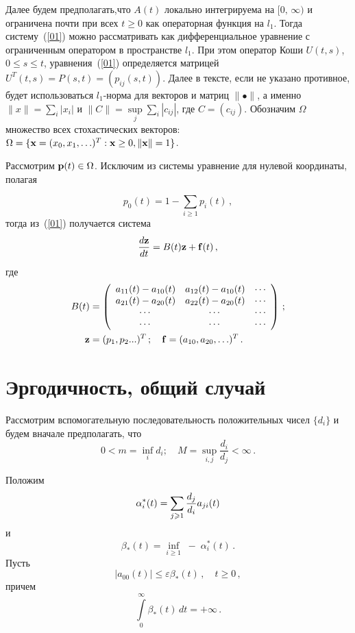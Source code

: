 \begin{multicols}{2}
Далее будем предполагать,что $A(t)$ локально интегрируема на
$[0,\,\infty)$ и ограничена почти при всех $t \ge 0 $ как
операторная функция  на $l_{1}$. Тогда систему~(\ref{01}) можно
рассматривать как дифференциальное уравнение с
ог\-ра\-ни\-чен\-ным оператором в пространстве $l_{1}$. При этом
оператор Коши $ U(t,s)$, $0{\leq s\leq t}$, уравнения~(\ref{01})
определяется матрицей $
U^{T}(t,s)=P(s,t)=\left(p_{ij}(s,t)\right)$. Далее в тексте, если
не указано противное,  будет использоваться  $l_{1}$-норма для
векторов и матриц $\| \bullet \|$, а именно $ \| x
\|=\sum\limits_{i}|x_{i}|$  и $ \| C \|=\sup\limits_j \sum_{i}|c_{ij}|$, где
$C=(c_{ij})$. Обозначим $\Omega$ множество всех стохастических
векторов: $\Omega= \{ {\bf x}=(x_{0},x_{1},\ldots )^{T} : {\bf x}\geq
0, \|{\bf x}\|=1 \}$.

Рассмотрим ${\bf p}(t)\in \Omega$. Исключим из системы уравнение
для нулевой координаты, полагая

$$
p_{0}(t)=1-\sum_{i\geq 1}
p_{i}(t)\,,
$$ тогда из~(\ref{01}) получается система
\begin{equation}
 \displaystyle\frac{\displaystyle d{\bf z}\mathstrut}{\displaystyle dt\mathstrut}=B(t){\bf z} + {\bf f} (t)\,, \label{02}
\end{equation}
где
\begin{align*}
B(t)&=\left(
\begin{array}{cccc}
a_{11}(t) - a_{10}(t) & a_{12}(t) - a_{10}(t)& \cdots \\
 a_{21}(t) - a_{20}(t) & a_{22}(t) - a_{20}(t) & \cdots
\\ \cdots & \cdots & \cdots
\\ \cdots & \cdots & \cdots
 \end{array}
\right)\,;\\
{\bf z}&=(p_{1},p_{2}...)^{T}\,; \quad {\bf
f}=(a_{10},a_{20},\ldots )^{T}\,.
\end{align*}

\section{Эргодичность, общий случай}

Рассмотрим вспомогательную последовательность положительных чисел
 $\{d_i\}$ и будем вначале предполагать,  что
\begin{equation}
0 < m = \inf_i d_i; \quad M=\sup_{i,j}\frac{d_i}{d_j} < \infty\,.
\label{0800}
\end{equation}

Положим
\begin{equation*}
\alpha_i^*(t)=\sum_{j \ge 1}
\fr{d_j}{d_i}a_{ji} (t) %
\end{equation*}
и
\begin{equation*}
\beta_* (t) = \inf_{ i \ge 1}\;-\;\alpha_i^*(t)\,.
\end{equation*}
Пусть
\begin{equation}
|a_{00}(t)| \le \varepsilon \beta_* (t)\,,\quad t \ge 0\,,
\label{n00041}
\end{equation}
причем
\begin{equation}
\int\limits_0^{\infty} \beta_* (t)\,dt = +\infty \label{n00044}\,.
\end{equation}


\end{multicols}
